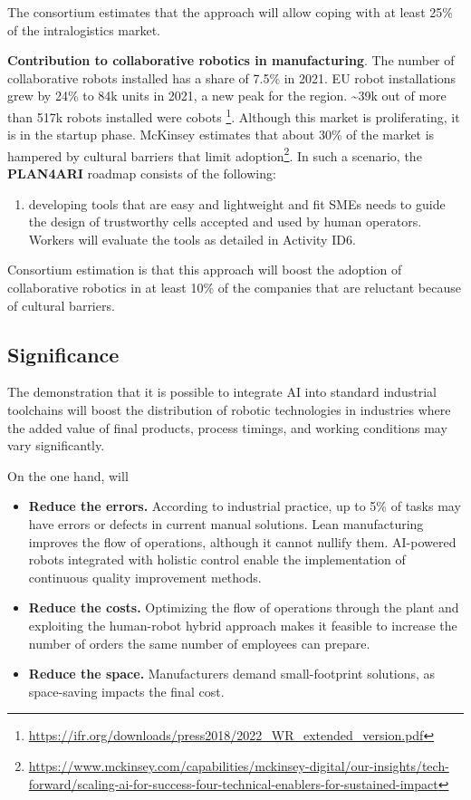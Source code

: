 The consortium estimates that the  approach will allow
coping with at least 25\% of the intralogistics market.

\textbf{Contribution to collaborative robotics in manufacturing}. The
number of collaborative robots installed has a share of 7.5\% in 2021.
EU robot installations grew by 24\% to 84k units in 2021, a new peak for
the region. \textasciitilde39k out of more than 517k robots installed
were cobots \footnote{\url{https://ifr.org/downloads/press2018/2022_WR_extended_version.pdf}}.
Although this market is proliferating, it is in the startup phase.
McKinsey estimates that about 30\% of the market is hampered by cultural
barriers that limit adoption\footnote{\url{https://www.mckinsey.com/capabilities/mckinsey-digital/our-insights/tech-forward/scaling-ai-for-success-four-technical-enablers-for-sustained-impact}}.
In such a scenario, the \textbf{PLAN4ARI} roadmap consists of the
following:

\begin{enumerate}
\def\labelenumi{\arabic{enumi}.}
\setcounter{enumi}{5}
\item
  developing tools that are easy and lightweight and fit
  SMEs\textquotesingle{} needs to guide the design of trustworthy cells
  accepted and used by human operators. Workers will evaluate the tools
  as detailed in Activity ID6.
\end{enumerate}

Consortium estimation is that this approach will boost the adoption of
collaborative robotics in at least 10\% of the companies that are
reluctant because of cultural barriers.

\subsection{Significance}\label{significance}

The  demonstration that it is
possible to integrate AI into standard industrial toolchains will boost
the distribution of robotic technologies in industries where the added
value of final products, process timings, and working conditions may
vary significantly.

On the one hand,  will

\begin{itemize}
\item
  \textbf{Reduce the errors.} According to industrial practice, up to
  5\% of tasks may have errors or defects in current manual solutions.
  Lean manufacturing improves the flow of operations, although it cannot
  nullify them. AI-powered robots integrated with holistic control
  enable the implementation of continuous quality improvement methods.
\item
  \textbf{Reduce the costs.} Optimizing the flow of operations through
  the plant and exploiting the human-robot hybrid approach makes it
  feasible to increase the number of orders the same number of employees
  can prepare.
\item
  \textbf{Reduce the space.} Manufacturers demand small-footprint
  solutions, as space-saving impacts the final cost.
\end{itemize}

